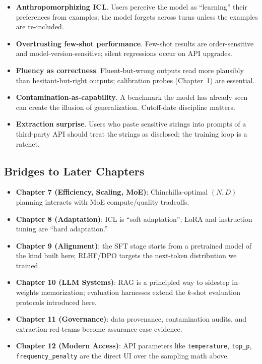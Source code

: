 \begin{itemize}
  \item \textbf{Anthropomorphizing ICL}. Users perceive the model as
        ``learning'' their preferences from examples; the model
        forgets across turns unless the examples are re-included.
  \item \textbf{Overtrusting few-shot performance}. Few-shot results
        are order-sensitive and model-version-sensitive; silent
        regressions occur on API upgrades.
  \item \textbf{Fluency as correctness}. Fluent-but-wrong outputs
        read more plausibly than hesitant-but-right outputs;
        calibration probes (Chapter~1) are essential.
  \item \textbf{Contamination-as-capability}. A benchmark the model
        has already seen can create the illusion of generalization.
        Cutoff-date discipline matters.
  \item \textbf{Extraction surprise}. Users who paste sensitive
        strings into prompts of a third-party API should treat the
        strings as disclosed; the training loop is a ratchet.
\end{itemize}

\subsection{Bridges to Later Chapters}

\begin{itemize}
  \item \textbf{Chapter 7 (Efficiency, Scaling, MoE)}: Chinchilla-optimal
        $(N, D)$ planning interacts with MoE compute/quality tradeoffs.
  \item \textbf{Chapter 8 (Adaptation)}: ICL is ``soft adaptation''; LoRA
        and instruction tuning are ``hard adaptation.''
  \item \textbf{Chapter 9 (Alignment)}: the SFT stage starts from a
        pretrained model of the kind built here; RLHF/DPO targets the
        next-token distribution we trained.
  \item \textbf{Chapter 10 (LLM Systems)}: RAG is a principled way to
        sidestep in-weights memorization; evaluation harnesses
        extend the $k$-shot evaluation protocols introduced here.
  \item \textbf{Chapter 11 (Governance)}: data provenance, contamination
        audits, and extraction red-teams become assurance-case
        evidence.
  \item \textbf{Chapter 12 (Modern Access)}: API parameters like
        \texttt{temperature}, \texttt{top\_p}, \texttt{frequency\_penalty}
        are the direct UI over the sampling math above.
\end{itemize}

